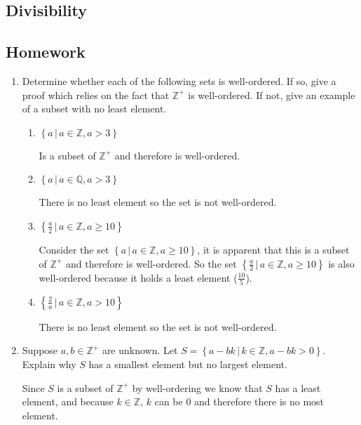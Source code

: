 \documentclass[class=article, crop=false]{standalone}
\def\integers{{\mathbb Z}}
\def\rationals{{\mathbb Q}}
\begin{document}
\subsection{Divisibility}

\subsection{Homework}
\begin{enumerate}

	\item
	  Determine whether each of the following sets is well-ordered.  If
	  so, give a proof which relies on the fact that $\integers^+$ is well-ordered.
	  If not, give an example of a subset with no least element.
	  \begin{enumerate}
	  \item
		$\left\{a\,\big|\, a\in\integers,a>3\right\}$
	
		Is a subset of $\integers^+$ and therefore is well-ordered.
	  \item
		$\left\{a\,\big|\, a\in\rationals,a>3\right\}$
	
		There is no least element so the set is not well-ordered.
	  \item
		$\left\{\frac a2\,\big|\, a\in\integers,a\geq 10\right\}$
	
		Consider the set $\left\{a\,\big|\, a\in\integers,a\geq 10\right\}$, it is apparent that this is a subset of $\integers^+$ and therefore is well-ordered.
		So the set $\left\{\frac a2\,\big|\, a\in\integers,a\geq 10\right\}$ is also well-ordered because it holds a least element ($\frac{10}{5}$).
	  \item
		$\left\{\frac 2a\,\big|\, a\in\integers,a>10\right\}$
	
		There is no least element so the set is not well-ordered.
	  \end{enumerate}
	
	\item
	  Suppose $a,b\in\integers^+$ are unknown.  Let
	  $S=\left\{a-bk\,\big|\, k\in\integers,a-bk>0\right\}$.
	  Explain why $S$ has a smallest element but no largest element.
	
	  Since $S$ is a subset of $\integers^+$ by well-ordering we know that $S$ has a least element, and because $k\in\integers$,
	  $k$ can be $0$ and therefore there is no most element.
	

\end{enumerate}
\end{document}
